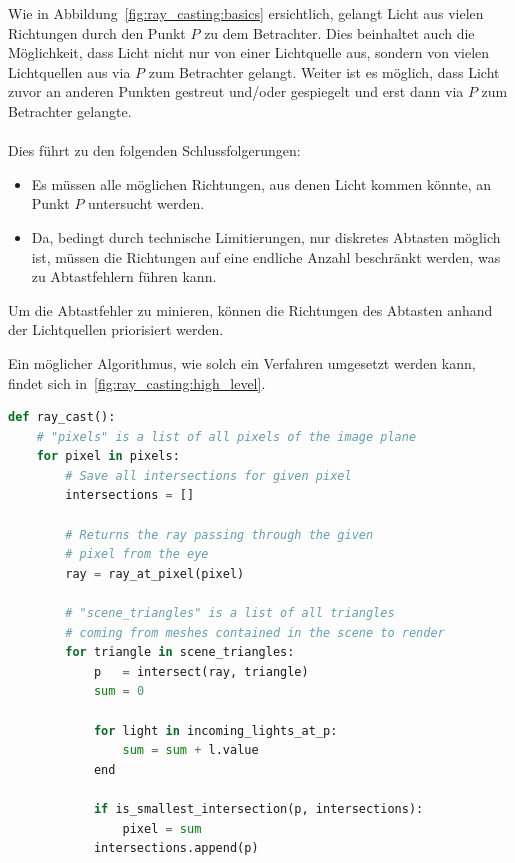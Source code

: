 Wie in Abbildung~\ref{fig:ray_casting:basics} ersichtlich, gelangt Licht aus vielen Richtungen durch den Punkt $P$ zu dem Betrachter. Dies beinhaltet auch die Möglichkeit, dass
Licht nicht nur von einer Lichtquelle aus, sondern von vielen Lichtquellen aus via $P$ zum Betrachter gelangt. Weiter ist es möglich, dass Licht zuvor an anderen Punkten gestreut
und/oder gespiegelt und erst dann via $P$ zum Betrachter gelangte.\\
\\
Dies führt zu den folgenden Schlussfolgerungen:
\begin{itemize}
    \item Es müssen alle möglichen Richtungen, aus denen Licht kommen könnte,
        an Punkt $P$ untersucht werden.
    \item Da, bedingt durch technische Limitierungen, nur diskretes Abtasten
        möglich ist, müssen die Richtungen auf eine endliche Anzahl beschränkt
        werden, was zu Abtastfehlern führen kann.
\end{itemize}
Um die Abtastfehler zu minieren, können die Richtungen des Abtasten anhand der Lichtquellen priorisiert werden.

\newpage{}

Ein möglicher Algorithmus, wie solch ein Verfahren umgesetzt werden kann,
findet sich in~\ref{fig:ray_casting:high_level}.

\begin{lstlisting}[language=Python,caption={Eine abstrakte Umsetzung des Ray
        Castings\protect\footnotemark.},label={fig:ray_casting:high_level},captionpos=b,emph={ray_cast}]
def ray_cast():
    # "pixels" is a list of all pixels of the image plane
    for pixel in pixels:
        # Save all intersections for given pixel
        intersections = []

        # Returns the ray passing through the given
        # pixel from the eye
        ray = ray_at_pixel(pixel)

        # "scene_triangles" is a list of all triangles
        # coming from meshes contained in the scene to render
        for triangle in scene_triangles:
            p   = intersect(ray, triangle)
            sum = 0

            for light in incoming_lights_at_p:
                sum = sum + l.value
            end

            if is_smallest_intersection(p, intersections):
                pixel = sum
            intersections.append(p)
\end{lstlisting}

